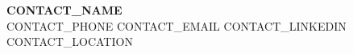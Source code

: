 \documentclass[letterpaper,10.5pt]{article}
\begin{document}
\begin{center}
    {\Huge\sffamily\bfseries {{{CONTACT_NAME}}}} \\ \vspace{4pt}
    \small {{{CONTACT_PHONE}}} \;\textbullet\; {{{CONTACT_EMAIL}}} \;\textbullet\;
    {{{CONTACT_LINKEDIN}}} \;\textbullet\; {{{CONTACT_LOCATION}}}
\end{center}








\end{document}
